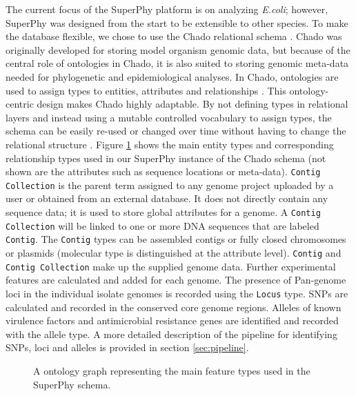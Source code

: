 \documentclass[a4paper,twoside]{article}
\begin{document}
The current focus of the SuperPhy platform is on analyzing \textit{E.coli}; however, SuperPhy was designed from the start to be extensible to other species. To make the database flexible, we chose to use the Chado relational schema \cite{mungall2007chado}. Chado was originally developed for storing model organism genomic data, but because of the central role of ontologies in Chado, it is also suited to storing genomic meta-data needed for phylogenetic and epidemiological analyses. In Chado, ontologies are used to assign types to entities, attributes and relationships \cite{mungall2007chado}. This ontology-centric design makes Chado highly adaptable. By not defining types in relational layers and instead using a mutable controlled vocabulary to assign types, the schema can be easily re-used or changed over time without having to change the relational structure \cite{mungall2007chado}.  Figure \ref{fig:ontology} shows the main entity types and corresponding relationship types used in our SuperPhy instance of the Chado schema (not shown are the attributes such as sequence locations or  meta-data). \texttt{Contig Collection} is the parent term assigned to any genome project uploaded by a user or obtained from an external database.  It does not directly contain any sequence data; it is used to store global attributes for a genome. A \texttt{Contig Collection} will be linked to one or more DNA sequences that are labeled \texttt{Contig}. The \texttt{Contig} types can be assembled contigs or fully closed chromosomes or plasmids (molecular type is distinguished at the attribute level). \texttt{Contig} and \texttt{Contig Collection} make up the supplied genome data. Further experimental features are calculated and added for each genome. The presence of Pan-genome loci in the individual isolate genomes is recorded using the \texttt{Locus} type. SNPs are calculated and recorded in the conserved core genome regions. Alleles of known virulence factors and antimicrobial resistance genes are identified and recorded with the allele type.  A more detailed description of the pipeline for identifying SNPs, loci and alleles is provided in section \ref{sec:pipeline}.

\begin{figure}[t]
  \vspace{-0.2cm}
  \centering
   {}
  \caption{A ontology graph representing the main feature types used in the SuperPhy schema.}
  \label{fig:ontology}
\end{figure}
\end{document}
